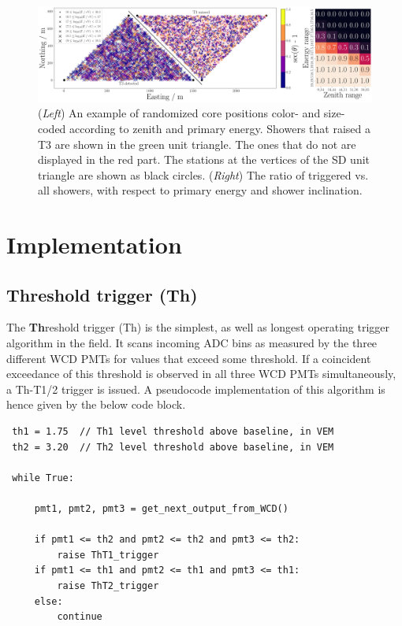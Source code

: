 \begin{figure}
	\centering
	\includegraphics[width=1\textwidth]{./plots/t3_mc_simulation.png}
	\caption{(\textit{Left}) An example of randomized core positions color- and size-coded according to zenith and primary energy. Showers that raised a T3 are 
	shown in the green unit triangle. The ones that do not are displayed in the red part. The stations at the vertices of the SD unit triangle are shown as black
	circles. (\textit{Right}) The ratio of triggered vs. all showers, with respect to primary energy and shower inclination.}
	\label{fig:t3-mc-simulation}
\end{figure}

\section{Implementation}
\label{sec:trigger-implementation}

\subsection{Threshold trigger (Th)}
\label{ssec:threshold-trigger}

The \textbf{Th}reshold trigger (Th) is the simplest, as well as longest operating trigger algorithm \cite{triggerGuide} in the field. It scans incoming 
ADC bins as measured by the three different WCD PMTs for values that exceed some threshold. If a coincident exceedance of this threshold is observed in 
all three WCD PMTs simultaneously, a Th-T1/2 trigger is issued. A pseudocode implementation of this algorithm is hence given by the below code block.

\begin{lstlisting}
 th1 = 1.75  // Th1 level threshold above baseline, in VEM   
 th2 = 3.20  // Th2 level threshold above baseline, in VEM  

 while True:

     pmt1, pmt2, pmt3 = get_next_output_from_WCD()

     if pmt1 <= th2 and pmt2 <= th2 and pmt3 <= th2:
         raise ThT1_trigger
     if pmt1 <= th1 and pmt2 <= th1 and pmt3 <= th1:
         raise ThT2_trigger
     else: 
         continue
\end{lstlisting}

